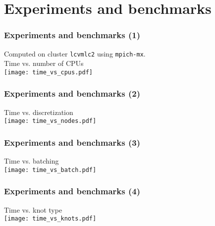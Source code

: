 \documentclass{beamer}
\begin{document}
\section{Experiments and benchmarks}

\begin{frame}
\frametitle{Experiments and benchmarks (1)}
Computed on cluster \texttt{lcvmlc2} using \texttt{mpich-mx}. \\
\vspace{.5cm}
\pause
Time vs. number of CPUs \\
\texttt{[image: time\_vs\_cpus.pdf]}
\end{frame}

\begin{frame}
\frametitle{Experiments and benchmarks (2)}
Time vs. discretization \\
\texttt{[image: time\_vs\_nodes.pdf]}
\end{frame}

\begin{frame}
\frametitle{Experiments and benchmarks (3)}
Time vs. batching \\
\texttt{[image: time\_vs\_batch.pdf]}
\end{frame}

\begin{frame}
\frametitle{Experiments and benchmarks (4)}
Time vs. knot type \\
\texttt{[image: time\_vs\_knots.pdf]}
\end{frame}
\end{document}
